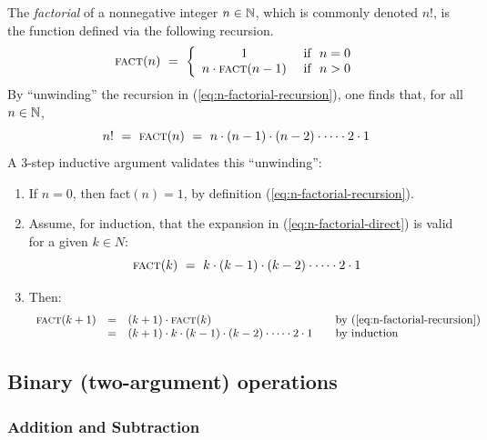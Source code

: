The {\it factorial} of a nonnegative integer $n \in \mathbb{N}$, which is
commonly denoted $n!$,
is the function defined via the following recursion.
\begin{equation}
\label{eq:n-factorial-recursion}
\mbox{\sc fact}(n) \ = \ \left\{
\begin{array}{cl}
1 & \mbox{  if } \ n=0 \\
n \cdot \mbox{\sc fact}(n-1) & \mbox{  if } \ n>0
\end{array}
\right.
\end{equation}
By ``unwinding'' the recursion in (\ref{eq:n-factorial-recursion}),
one finds that, for all $n \in \mathbb{N}$,
\begin{equation}
\label{eq:n-factorial-direct}
n! \ = \ \mbox{\sc fact}(n) \ = \ 
n \cdot (n-1) \cdot (n-2) \cdot \cdots \cdot 2 \cdot 1
\end{equation} 
A $3$-step inductive argument validates this ``unwinding'':
\begin{enumerate}
\item
If $n =0$, then {\sc fact}$(n) = 1$, by definition
(\ref{eq:n-factorial-recursion}).
\item
Assume, for induction, that the expansion in
(\ref{eq:n-factorial-direct}) is valid for a given $k \in N$:
\[ \mbox{\sc fact}(k) \ = \ k \cdot (k-1) \cdot (k-2) \cdot \cdots
\cdot 2 \cdot 1 \] 
\item
Then:
\[
\begin{array}{lclll}
\mbox{\sc fact}(k+1) & = & (k+1) \cdot \mbox{\sc fact}(k)
  & & \mbox{by (\ref{eq:n-factorial-recursion})} \\
  & = &
(k+1) \cdot k \cdot (k-1) \cdot (k-2) \cdot \cdots \cdot 2 \cdot 1
  & & \mbox{by induction}
\end{array}
\]
\end{enumerate}


\subsection{Binary (two-argument) operations}
\label{sec:binary-operators}

\subsubsection{Addition and Subtraction}

